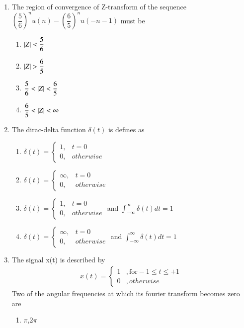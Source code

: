 \begin{enumerate}[label=\arabic*.,ref=\theenumi]
\item The region of convergence of Z-transform of the sequence $\left(\dfrac{5}{6}\right)^nu(n) -\left(\dfrac{6}{5}\right)^nu(-n-1)$ must be
\begin{enumerate}[label = (\Alph*)]
\setlength\itemsep{0.7em}
    \item $\left\vert Z\right\vert < \dfrac{5}{6}$
    \item $\left\vert Z\right\vert > \dfrac{6}{5}$
    \item $\dfrac{5}{6} < \left\vert Z\right\vert < \dfrac{6}{5}$
    \item $\dfrac{6}{5} < \left\vert Z\right\vert < \infty$
\end{enumerate}
\solution

\item The dirac-delta function $\delta(t)$ is defines as 
\begin{enumerate}
    \item $\delta(t)=  \begin{cases}
 1 , & t=0\\
 0, & otherwise
 \end{cases}$
  \item $\delta(t)=  \begin{cases}
 \infty , & t=0\\
 0, & otherwise
 \end{cases}$
  \item $\delta(t)=  \begin{cases}
 1 , & t=0\\
 0, & otherwise
 \end{cases}$ and $\int_{-\infty}^{\infty} \delta(t)dt =1$
  \item $\delta(t)=  \begin{cases}
\infty , & t=0\\
 0, & otherwise
 \end{cases}$ and $\int_{-\infty}^{\infty} \delta(t)dt =1$
\end{enumerate}
\solution

\item The signal x(t) is described by 
\begin{align}
 x(t)=
\begin{cases}
1 & ,\text{for} -1 \leq t \leq +1\\
0 & ,otherwise
\end{cases} 
\end{align}
Two of the angular frequencies at which its fourier transform becomes zero are 
\begin{enumerate}
\item\label{1} $\pi$,2$\pi$

\end{enumerate}
\end{enumerate}
